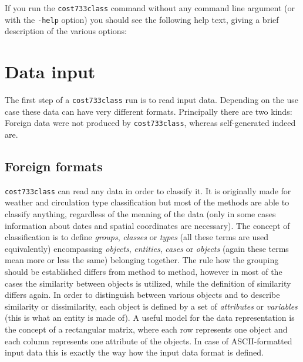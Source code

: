 \documentclass[12pt, oneside, a4paper, headsepline, plainheadsepline]{scrbook}
\begin{document}
If you run the \verb+cost733class+ command without any command line argument (or with the \verb+-help+ option) 
you should see the following help text, giving a brief description of the various options:



%


\chapter{Data input}
\label{datainput}
The first step of a \verb+cost733class+ run is to read input data. Depending on the use case these data can have very different formats. Principally there are two kinds: Foreign data
were not produced by \verb+cost733class+, whereas self-generated indeed are.

\section{Foreign formats}
\label{fileformats}
\verb+cost733class+ can read any data in order to classify it. It is originally made for weather and
circulation type classification but most of the methods are able to classify anything, regardless of
the meaning of the data (only in some cases information about dates and spatial coordinates are necessary).
The concept of classification is to define \textit{groups}, \textit{classes} or \textit{types} (all these terms are used equivalently) encompassing \textit{objects}, \textit{entities}, \textit{cases} or \textit{objects} (again these terms mean more or less the same) belonging together. 
The rule how the grouping should be established differs from method to method, however in most of the cases the similarity between objects is utilized, while the definition of similarity differs again. In order to distinguish between various objects and to describe similarity or dissimilarity, each object is defined by a set of \textit{attributes} or \textit{variables} (this is what an entity is made of).
A useful model for the data representation is the concept of a rectangular matrix, where each row represents one object and each column represents one attribute of the objects. In case of ASCII-formatted input data this is exactly the way how the input data format is defined.
\end{document}
